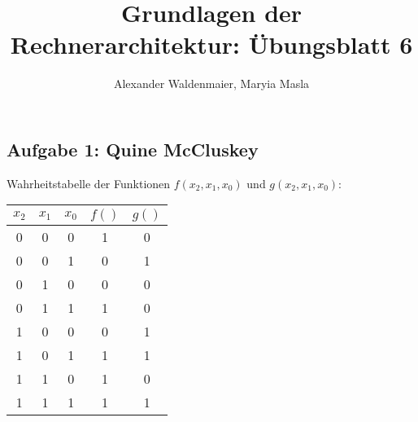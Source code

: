 \documentclass{article}
\title{Grundlagen der Rechnerarchitektur: Übungsblatt 6}
\author{Alexander Waldenmaier, Maryia Masla}
\begin{document}
    \maketitle

    \subsection*{Aufgabe 1: Quine McCluskey}
    Wahrheitstabelle der Funktionen $f(x_2,x_1,x_0)$ und $g(x_2,x_1,x_0)$:\\
    \begin{center}
    	\begin{tabular}{ccc|cc}
    		$x_2$&$x_1$&$x_0$&$f()$&$g()$ \\
    		\hline
    		0& 0& 0&1 &0 \\
    		0& 0& 1& 0&1 \\
    		0& 1& 0& 0&0 \\
    		0& 1& 1& 1&0 \\
    		1& 0& 0& 0&1 \\
    		1& 0& 1& 1&1 \\
    		1& 1& 0& 1&0 \\
    		1& 1& 1& 1&1 \\
    	\end{tabular}
    \end{center}
\end{document}
